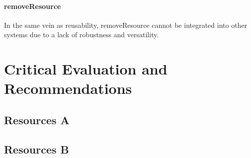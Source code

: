 \documentclass[a4paper]{article}
\begin{document}
\paragraph{removeResource}
In the same vein as reusability, removeResource cannot be integrated into other systems due to a lack of robustness and versatility.


\section {Critical Evaluation and Recommendations}
\subsection {Resources A}
\subsection {Resources B}

\end{document}
